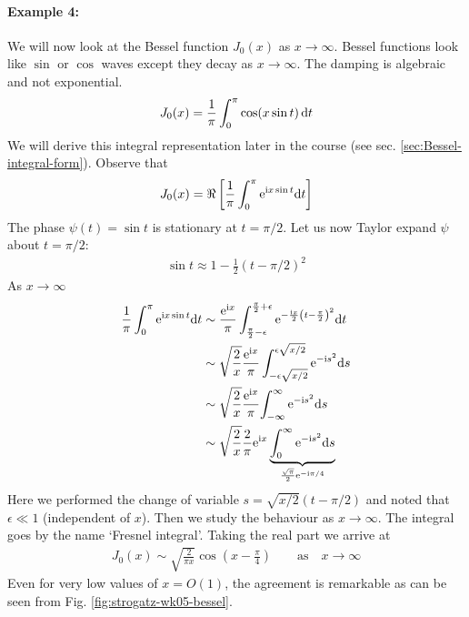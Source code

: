 \paragraph{Example 4:} We will now look at the Bessel function $J_0(x)$ as $x \rightarrow \infty$. Bessel functions look like $\sin$ or $\cos$ waves except they decay as $x \rightarrow \infty$. The damping is algebraic and not exponential. 
\begin{align}
	J_0(x) = \frac{1}{\pi} \int_{0}^{\pi}\cos (x \sin t) \, \mathrm{d} t \label{eqn:bessel-zero}
\end{align}
We will derive this integral representation later in the course (see sec. \ref{sec:Bessel-integral-form}). Observe that
\begin{gather*}
	J_0(x) = \Re \left[\frac{1}{\pi} \int_{0}^{\pi} \mathrm{e}^{\mathrm{i} x \sin t} \mathrm{d} t\right]
\end{gather*}
The phase $\psi(t) = \sin t$ is stationary at $t=\pi/2$. Let us now Taylor expand $\psi$ about $t=\pi/2$:
\begin{gather*}
	\sin t \approx  1 - \frac{1}{2}(t-\pi/2)^2 
\end{gather*}
As $x \rightarrow \infty$
\begin{align*}
	\frac{1}{\pi} \int_{0}^{\pi} \mathrm{e}^{\mathrm{i} x \sin t} \mathrm{d} t &\sim \frac{\mathrm{e}^{\mathrm{i} x}}{\pi} \int_{\frac{\pi}{2}-\epsilon}^{\frac{\pi}{2}+\epsilon} \mathrm{e}^{-\frac{\mathrm{i} x}{2} \left(t-\frac{\pi}{2}\right)^2} \mathrm{d} t \\
	& \sim \sqrt{\frac{2}{x}} \frac{\mathrm{e}^{\mathrm{i} x}}{\pi} \int_{-\epsilon \sqrt{x/2}}^{\epsilon \sqrt{x/2}} \mathrm{e}^{-\mathrm{i} s^2} \mathrm{d} s \\
	&\sim \sqrt{\frac{2}{x}} \frac{\mathrm{e}^{\mathrm{i} x}}{\pi} {\int_{-\infty}^{\infty} \mathrm{e}^{-\mathrm{i} s^2} \mathrm{d} s}\\
	& \sim \sqrt{\frac{2}{x}} \frac{2}{\pi}\mathrm{e}^{\mathrm{i} x} \underbrace{\int_{0}^{\infty} \mathrm{e}^{-\mathrm{i} s^2} \mathrm{d} s}_{{\frac{\sqrt{\pi}}{2}}\mathrm{e}^{-\mathrm{i} \pi/4}}
\end{align*}
Here we performed the change of variable $s = \sqrt{x/2}(t-\pi/2)$ and noted that $\epsilon \ll 1$ (independent of $x$). Then we study the behaviour as $x \rightarrow \infty$. The integral goes by the name `Fresnel integral'. Taking the real part we arrive at
\begin{gather}
	J_0(x) \sim \sqrt{\frac{2}{\pi x}} \cos \left(x - \frac{\pi}{4}\right) \qquad \text{as} \quad x \rightarrow \infty \label{eqn:bessel-approx}
\end{gather}
Even for very low values of $x=O(1)$, the agreement is remarkable as can be seen from Fig. \ref{fig:strogatz-wk05-bessel}.

